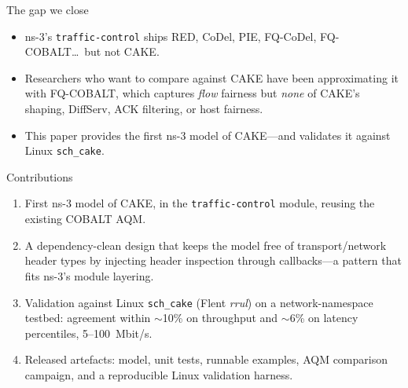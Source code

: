 \documentclass[10pt,aspectratio=169]{beamer}
\begin{document}
\begin{frame}{The gap we close}
\begin{itemize}
  \item ns-3's \texttt{traffic-control} ships RED, CoDel, PIE, FQ-CoDel,
        FQ-COBALT\ldots\ but \alert{not CAKE}.
  \item Researchers who want to compare against CAKE have been approximating
        it with FQ-COBALT, which captures \emph{flow} fairness but \emph{none}
        of CAKE's shaping, DiffServ, ACK filtering, or host fairness.
  \item This paper provides the first ns-3 model of CAKE---and validates it
        against Linux \texttt{sch\_cake}.
\end{itemize}
\end{frame}

\begin{frame}{Contributions}
\begin{enumerate}
  \item First ns-3 model of CAKE, in the \texttt{traffic-control} module,
        reusing the existing COBALT AQM.
  \item A \alert{dependency-clean design} that keeps the model free of
        transport/network header types by injecting header inspection through
        callbacks---a pattern that fits ns-3's module layering.
  \item Validation against Linux \texttt{sch\_cake} (Flent \emph{rrul}) on a
        network-namespace testbed: agreement within $\sim$10\% on throughput
        and $\sim$6\% on latency percentiles, 5--100~Mbit/s.
  \item Released artefacts: model, unit tests, runnable examples, AQM
        comparison campaign, and a reproducible Linux validation harness.
\end{enumerate}
\end{frame}
\end{document}

